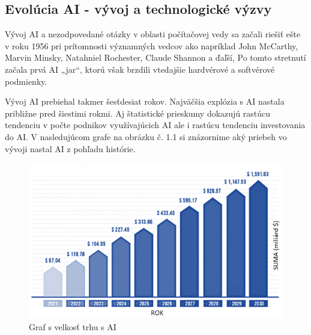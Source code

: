 

\subsection{Evolúcia AI - vývoj a technologické výzvy}

Vývoj AI a nezodpovedané otázky v oblasti počítačovej vedy sa začali riešiť ešte v roku 1956 pri prítomnosti významných vedcov ako napríklad John McCarthy, Marvin Minsky, Natahniel Rochester, Claude Shannon a ďaľší,  Po tomto stretnutí začala prvá AI „jar“, ktorú však brzdili vtedajšie hardvérové a softvérové podmienky. \cite{tencent2021}
\par Vývoj AI prebiehal takmer šesťdesiat rokov. Najväčšia explózia s AI nastala približne pred šiestimi rokmi. Aj štatistické prieskumy dokazujú rastúcu tendenciu v počte podnikov využívajúcich AI ale i rastúcu tendenciu investovania do AI. V nasledujúcom grafe na obrázku č. 1.1 si znázornime aký priebeh vo vývoji nastal AI z pohľadu histórie. 

\begin{figure}[!ht]
    \centering
    \includegraphics[width=1\textwidth]{figures/graf1.png}
    \caption{Graf s velkosť trhu s AI\label{Graf s velkosť trhu s AI}}
\end{figure}

